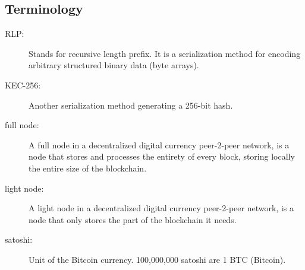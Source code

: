 \documentclass[USenglish]{uit-thesis}
\begin{document}
\begin{appendices}
	\chapter{Terminology}
	\label{app:terminology}
	\begin{description}
		\item[RLP:] Stands for recursive length prefix. It is a serialization method
		for encoding arbitrary structured binary data (byte arrays).
		\label{item:rlp}
		\item[KEC-256:] Another serialization method generating a 256-bit hash.
		\item[full node:] A full node in a decentralized digital currency peer-2-peer network, is a node that stores
		and processes the entirety of every block, storing locally the entire size of the blockchain.
		\item[light node:] A light node in a decentralized digital currency peer-2-peer network, is a node that only
		stores the part of the blockchain it needs.
		\item[satoshi:] Unit of the Bitcoin currency. 100,000,000 satoshi are 1 BTC (Bitcoin).
	\end{description}

%


\end{appendices}
\end{document}

